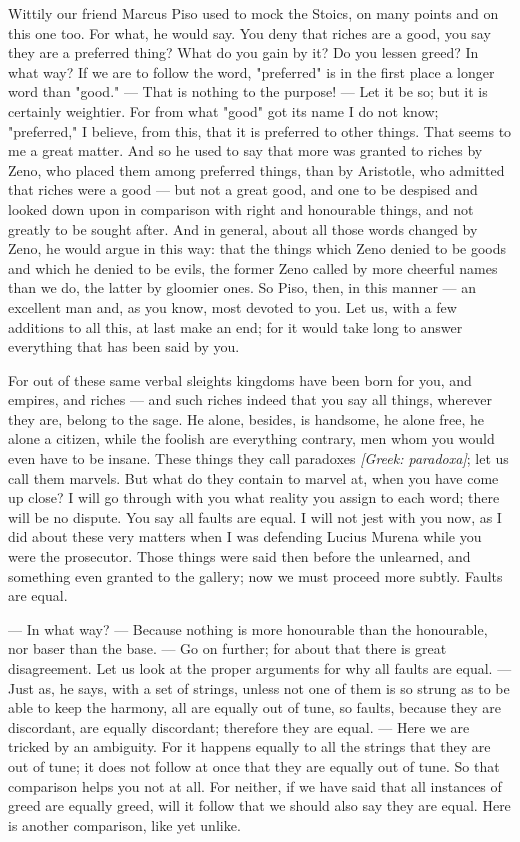  Wittily our friend Marcus Piso used to mock the Stoics, on many points and on this one too. For what, he would say. You deny that riches are a good, you say they are a preferred thing? What do you gain by it? Do you lessen greed? In what way? If we are to follow the word, "preferred" is in the first place a longer word than "good." — That is nothing to the purpose! — Let it be so; but it is certainly weightier. For from what "good" got its name I do not know; "preferred," I believe, from this, that it is preferred to other things. That seems to me a great matter. And so he used to say that more was granted to riches by Zeno, who placed them among preferred things, than by Aristotle, who admitted that riches were a good — but not a great good, and one to be despised and looked down upon in comparison with right and honourable things, and not greatly to be sought after. And in general, about all those words changed by Zeno, he would argue in this way: that the things which Zeno denied to be goods and which he denied to be evils, the former Zeno called by more cheerful names than we do, the latter by gloomier ones. So Piso, then, in this manner — an excellent man and, as you know, most devoted to you. Let us, with a few additions to all this, at last make an end; for it would take long to answer everything that has been said by you.

 For out of these same verbal sleights kingdoms have been born for you, and empires, and riches — and such riches indeed that you say all things, wherever they are, belong to the sage. He alone, besides, is handsome, he alone free, he alone a citizen, while the foolish are everything contrary, men whom you would even have to be insane. These things they call paradoxes \textit{[Greek: paradoxa]}; let us call them marvels. But what do they contain to marvel at, when you have come up close? I will go through with you what reality you assign to each word; there will be no dispute. You say all faults are equal. I will not jest with you now, as I did about these very matters when I was defending Lucius Murena while you were the prosecutor. Those things were said then before the unlearned, and something even granted to the gallery; now we must proceed more subtly. Faults are equal.

 — In what way? — Because nothing is more honourable than the honourable, nor baser than the base. — Go on further; for about that there is great disagreement. Let us look at the proper arguments for why all faults are equal. — Just as, he says, with a set of strings, unless not one of them is so strung as to be able to keep the harmony, all are equally out of tune, so faults, because they are discordant, are equally discordant; therefore they are equal. — Here we are tricked by an ambiguity. For it happens equally to all the strings that they are out of tune; it does not follow at once that they are equally out of tune. So that comparison helps you not at all. For neither, if we have said that all instances of greed are equally greed, will it follow that we should also say they are equal. Here is another comparison, like yet unlike.

